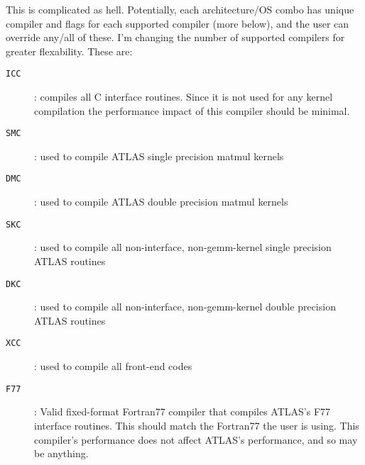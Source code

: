 \documentclass[11pt]{article}
\begin{document}
This is complicated as hell.  Potentially, each architecture/OS combo has
unique compiler and flags for each supported compiler (more below), and the 
user can override any/all of these.  I'm changing the number of supported
compilers for greater flexability.  These are:
\begin{description}
\item [{\tt ICC}] : compiles all C interface routines.
      Since it is not used for any kernel compilation
      the performance impact of this compiler should be minimal.
\item [{\tt SMC}] : used to compile ATLAS single precision matmul kernels
\item [{\tt DMC}] : used to compile ATLAS double precision matmul kernels
\item [{\tt SKC}] : used to compile all non-interface, non-gemm-kernel
                    single precision ATLAS routines
\item [{\tt DKC}] : used to compile all non-interface, non-gemm-kernel
                    double precision ATLAS routines
\item [{\tt XCC}] : used to compile all front-end codes
\item [{\tt F77}] : Valid fixed-format Fortran77 compiler that compiles
      ATLAS's F77 interface routines.  This should match the Fortran77
      the user is using.  This compiler's performance
      does not affect ATLAS's performance, and so may be anything.
\end{description}

\end{document}
